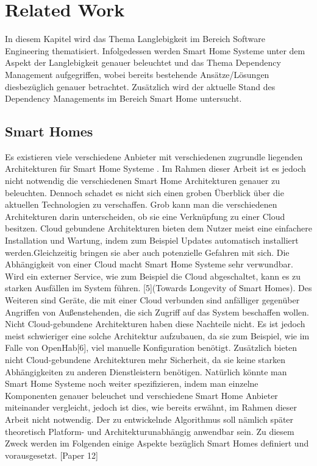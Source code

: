 \chapter{Related Work}\label{ch:related_work}


In diesem Kapitel wird das Thema Langlebigkeit im Bereich Software Engineering thematisiert. Infolgedessen werden
Smart Home Systeme unter dem Aspekt der Langlebigkeit genauer beleuchtet und  das Thema Dependency Management aufgegriffen, wobei bereits 
bestehende Ansätze/Lösungen diesbezüglich genauer betrachtet. Zusätzlich wird der aktuelle Stand des Dependency Managements im 
Bereich Smart Home untersucht.


\section{Smart Homes}
Es existieren viele verschiedene Anbieter mit verschiedenen zugrundle liegenden Architekturen für Smart Home Systeme .
Im Rahmen dieser Arbeit ist es jedoch nicht notwendig die verschiedenen Smart Home Architekturen genauer zu beleuchten. 
Dennoch schadet es nicht sich einen groben Überblick über die aktuellen Technologien zu verschaffen. Grob kann man die
verschiedenen Architekturen darin unterscheiden, ob sie eine Verknüpfung zu einer Cloud besitzen. Cloud gebundene
Architekturen bieten dem Nutzer meist eine einfachere Installation und Wartung, indem zum 
Beispiel Updates automatisch installiert werden.Gleichzeitig bringen sie aber auch potenzielle Gefahren mit sich. Die 
Abhängigkeit von einer Cloud macht Smart Home Systeme sehr verwundbar. Wird ein externer Service, wie zum
Beispiel die Cloud abgeschaltet, kann es zu starken Ausfällen im System führen. [5](Towards Longevity of Smart Homes).
Des Weiteren sind Geräte, die mit einer Cloud verbunden sind anfälliger gegenüber Angriffen von Außenstehenden, die sich 
Zugriff auf das System beschaffen wollen.
Nicht Cloud-gebundene Architekturen haben diese Nachteile nicht. Es ist jedoch meist schwieriger eine solche Architektur aufzubauen, 
da sie zum Beispiel, wie im Falle von OpenHab[6], viel manuelle Konfiguration benötigt. Zusätzlich bieten nicht Cloud-gebundene Architekturen
mehr Sicherheit, da sie keine starken Abhängigkeiten zu anderen Dienstleistern benötigen.
Natürlich könnte man Smart Home Systeme noch weiter spezifizieren, indem man einzelne Komponenten genauer beleuchet und 
verschiedene Smart Home Anbieter miteinander vergleicht, jedoch ist dies, wie bereits erwähnt, im Rahmen dieser 
Arbeit nicht notwendig. Der zu entwickelnde Algorithmus soll nämlich später theoretisch Platform- und Architekturunabhängig anwendbar sein.
Zu diesem Zweck werden im Folgenden einige Aspekte bezüglich Smart Homes definiert und vorausgesetzt. [Paper 12]

